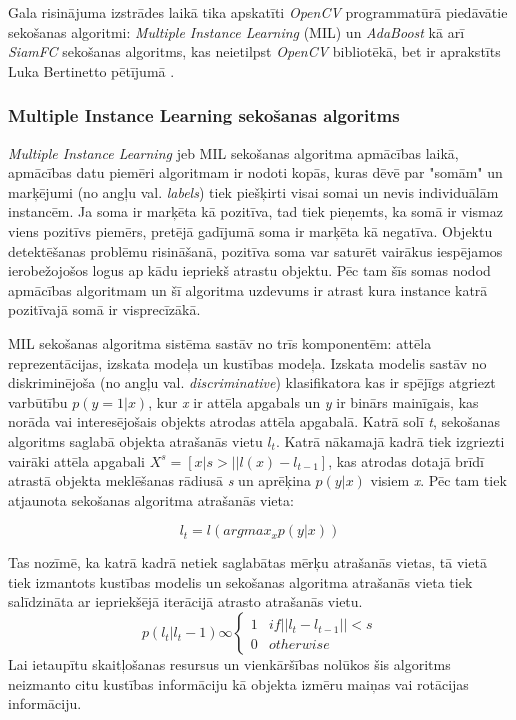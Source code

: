 Gala risinājuma izstrādes laikā tika apskatīti \textit{OpenCV} programmatūrā piedāvātie sekošanas algoritmi: \textit{Multiple Instance Learning} (MIL) un \textit{AdaBoost} kā arī \textit{SiamFC} sekošanas algoritms, kas neietilpst \textit{OpenCV} bibliotēkā, bet ir aprakstīts Luka Bertinetto pētījumā \cite{bertinetto2016fully}.

\subsubsection{Multiple Instance Learning sekošanas algoritms}
\textit{Multiple Instance Learning} jeb MIL sekošanas algoritma apmācības laikā, apmācības datu piemēri algoritmam ir nodoti kopās, kuras dēvē par "somām" un marķējumi (no angļu val. \textit{labels}) tiek piešķirti visai somai un nevis individuālām instancēm. Ja soma ir marķēta kā pozitīva, tad tiek pieņemts, ka somā ir vismaz viens pozitīvs piemērs, pretējā gadījumā soma ir marķēta kā negatīva. Objektu detektēšanas problēmu risināšanā, pozitīva soma var saturēt vairākus iespējamos ierobežojošos logus ap kādu iepriekš atrastu objektu. Pēc tam šīs somas nodod apmācības algoritmam un šī algoritma uzdevums ir atrast kura instance katrā pozitīvajā somā ir visprecīzākā. 

MIL sekošanas algoritma sistēma sastāv no trīs komponentēm: attēla reprezentācijas, izskata modeļa un kustības modeļa. Izskata modelis sastāv no diskriminējoša (no angļu val. \textit{discriminative}) klasifikatora kas ir spējīgs atgriezt varbūtību $ p(y = 1|x) $, kur \textit{x} ir attēla apgabals un \textit{y} ir binārs mainīgais, kas norāda vai  interesējošais objekts atrodas attēla apgabalā. Katrā solī \textit{t}, sekošanas algoritms saglabā objekta atrašanās vietu $ l_t $. Katrā nākamajā kadrā tiek izgriezti vairāki attēla apgabali $ X^s = [x|s > ||  l(x) - l_{t-1}]$, kas atrodas dotajā brīdī atrastā objekta meklēšanas rādiusā \textit{s} un aprēķina $p(y|x)$ visiem \textit{x}. Pēc tam tiek atjaunota sekošanas algoritma atrašanās vieta:

\begin{equation}
l_t = l (argmax_{x} p(y|x))
\end{equation}

Tas nozīmē, ka katrā kadrā netiek saglabātas mērķu atrašanās vietas, tā vietā tiek izmantots kustības modelis un  sekošanas algoritma atrašanās vieta tiek salīdzināta ar iepriekšējā iterācijā atrasto atrašanās vietu.
\begin{equation}
p(l_t|l_t-1) \infty 
\begin{cases} 
1 & if ||l_t - l_{t-1}|| < s \\
0 & otherwise
\end{cases}
\end{equation}
Lai ietaupītu skaitļošanas resursus un vienkāršības nolūkos šis algoritms neizmanto citu kustības informāciju kā objekta izmēru maiņas vai rotācijas informāciju.

